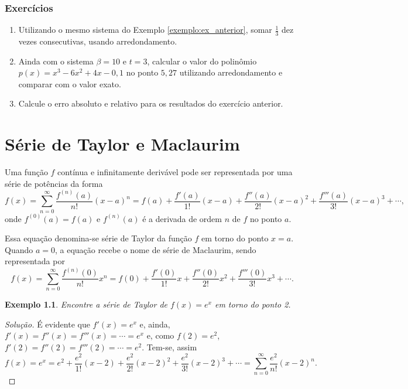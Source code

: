 \documentclass[
	12pt,				%
	openright,			%
	twoside,			%
	a4paper,			%
	english,			%
	french,				%
	brazil,				%
	sumario=tradicional
]{abntex2}
\newtheorem{example}{Exemplo}
\newenvironment{solution}{
	\begin{proof}[Solução]
}{\end{proof}}
\numberwithin{example}{chapter}
\numberwithin{remark}{chapter}
\numberwithin{definition}{chapter}
\numberwithin{figure}{chapter}
\begin{document}
\subsection{Exercícios}

\begin{enumerate}
	\item Utilizando o mesmo sistema do Exemplo \ref{exemplo:ex_anterior}, somar $\frac{1}{3}$ dez vezes consecutivas, usando arredondamento.
	
	\item Ainda com o sistema $\beta=10$ e $t=3$, calcular o valor do polinômio $p(x)=x^3-6x^2+4x-0,1$ no ponto $5,27$ utilizando arredondamento e comparar com o valor exato.
	
	\item Calcule o erro absoluto e relativo para os resultados do exercício anterior.
\end{enumerate}

\chapter{Série de Taylor e Maclaurim}

Uma função $f$ contínua e infinitamente derivável pode ser representada por uma série de potências da forma
$$
    f(x)=
        \sum_{n=0}^{\infty} \frac{f^{(n)}(a)}{n!} (x-a)^n
    =
        f(a)
        + \frac{f'(a)}{1!}(x-a)
        + \frac{f''(a)}{2!}(x-a)^2
        + \frac{f'''(a)}{3!}(x-a)^3
        +\cdots
        \text{,}
$$
onde $f^{(0)}(a)=f(a)$ e $f^{(n)}(a)$ é a derivada de ordem $n$ de $f$ no ponto $a$.

Essa equação denomina-se série de Taylor da função $f$ em torno do ponto $x=a$. Quando $a=0$, a equação recebe o nome de série de Maclaurim, sendo representada por
$$
    f(x)=
        \sum_{n=0}^{\infty} \frac{f^{(n)}(0)}{n!}x^n
    =
    f(0)
    +\frac{f'(0)}{1!}x
    +\frac{f''(0)}{2!}x^2
    +\frac{f'''(0)}{3!}x^3
    +\cdots
    \text{.}
$$

\begin{example}
    Encontre a série de Taylor de $f(x)=e^x$ em torno do ponto 2.
\end{example}
\begin{solution}
    É evidente que $f'(x)=e^x$ e, ainda, $f'(x)=f''(x)=f'''(x)=\cdots=e^x$ e, como $f(2)=e^2$, $f'(2)=f''(2)=f'''(2)=\cdots=e^2$. Tem-se, assim
    $$
    f(x)=e^x=
    e^2
    +\frac{e^2}{1!}(x-2)
    +\frac{e^2}{2!}(x-2)^2
    +\frac{e^2}{3!}(x-2)^3
    + \cdots
    = \sum_{n=0}^{\infty} \frac{e^2}{n!}(x-2)^n
    \text{.}
    $$
\end{solution}
\end{document}
